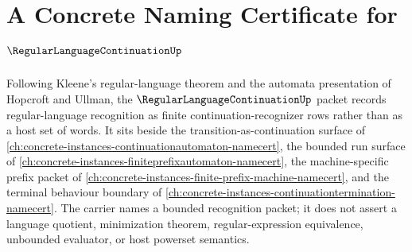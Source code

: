 \chapter{A Concrete Naming Certificate for $\RegularLanguageContinuationUp$}
\label{ch:concrete-instances-regular-language-continuation-namecert}

Following Kleene's regular-language theorem and the automata presentation of Hopcroft and Ullman, the $\RegularLanguageContinuationUp$ packet records regular-language recognition as finite continuation-recognizer rows rather than as a host set of words. It sits beside the transition-as-continuation surface of \autoref{ch:concrete-instances-continuationautomaton-namecert}, the bounded run surface of \autoref{ch:concrete-instances-finiteprefixautomaton-namecert}, the machine-specific prefix packet of \autoref{ch:concrete-instances-finite-prefix-machine-namecert}, and the terminal behaviour boundary of \autoref{ch:concrete-instances-continuationtermination-namecert}. The carrier names a bounded recognition packet; it does not assert a language quotient, minimization theorem, regular-expression equivalence, unbounded evaluator, or host powerset semantics.

